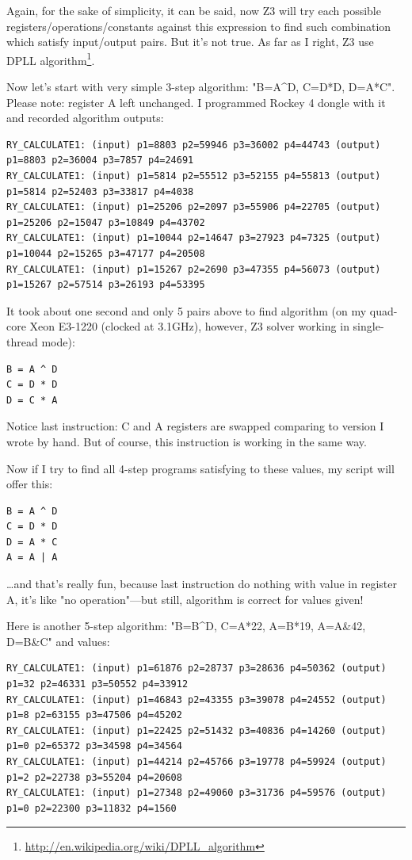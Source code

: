 Again, for the sake of simplicity, it can be said, now Z3 will try each possible registers/operations/constants against this expression to find such combination which satisfy input/output pairs. 
But it's not true. 
As far as I right, Z3 use DPLL algorithm\footnote{\url{http://en.wikipedia.org/wiki/DPLL_algorithm}}.

Now let's start with very simple 3-step algorithm: "B=A\^{}D, C=D*D, D=A*C". Please note: register A left unchanged.
I programmed Rockey 4 dongle with it and recorded algorithm outputs:

\begin{lstlisting}
RY_CALCULATE1: (input) p1=8803 p2=59946 p3=36002 p4=44743 (output) p1=8803 p2=36004 p3=7857 p4=24691
RY_CALCULATE1: (input) p1=5814 p2=55512 p3=52155 p4=55813 (output) p1=5814 p2=52403 p3=33817 p4=4038
RY_CALCULATE1: (input) p1=25206 p2=2097 p3=55906 p4=22705 (output) p1=25206 p2=15047 p3=10849 p4=43702
RY_CALCULATE1: (input) p1=10044 p2=14647 p3=27923 p4=7325 (output) p1=10044 p2=15265 p3=47177 p4=20508
RY_CALCULATE1: (input) p1=15267 p2=2690 p3=47355 p4=56073 (output) p1=15267 p2=57514 p3=26193 p4=53395
\end{lstlisting}

It took about one second and only 5 pairs above to find algorithm (on my quad-core Xeon E3-1220 (clocked at 3.1GHz), 
however, Z3 solver working in single-thread mode):

\begin{lstlisting}
B = A ^ D
C = D * D
D = C * A
\end{lstlisting}

Notice last instruction: C and A registers are swapped comparing to version I wrote by hand. 
But of course, this instruction is working in the same way.

Now if I try to find all 4-step programs satisfying to these values, my script will offer this:

\begin{lstlisting}
B = A ^ D
C = D * D
D = A * C
A = A | A
\end{lstlisting}

\dots and that's really fun, because last instruction do nothing with value in register A, it's like "no operation"---but still, algorithm is correct for values given!

Here is another 5-step algorithm: "B=B\^{}D, C=A*22, A=B*19, A=A\&42, D=B\&C" and values:

\begin{lstlisting}
RY_CALCULATE1: (input) p1=61876 p2=28737 p3=28636 p4=50362 (output) p1=32 p2=46331 p3=50552 p4=33912
RY_CALCULATE1: (input) p1=46843 p2=43355 p3=39078 p4=24552 (output) p1=8 p2=63155 p3=47506 p4=45202
RY_CALCULATE1: (input) p1=22425 p2=51432 p3=40836 p4=14260 (output) p1=0 p2=65372 p3=34598 p4=34564
RY_CALCULATE1: (input) p1=44214 p2=45766 p3=19778 p4=59924 (output) p1=2 p2=22738 p3=55204 p4=20608
RY_CALCULATE1: (input) p1=27348 p2=49060 p3=31736 p4=59576 (output) p1=0 p2=22300 p3=11832 p4=1560
\end{lstlisting}

